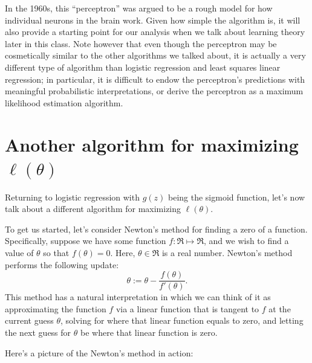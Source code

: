 \documentclass{article}
\begin{document}
In the 1960s, this ``perceptron'' was argued to be a rough model for
how individual neurons in the brain work.  Given how simple the algorithm
is, it will also provide a starting point for our analysis when we talk
about learning theory later in this class.  Note however
that even though the perceptron may be cosmetically similar to the other
algorithms we talked about, it is actually a very different type of algorithm
than logistic regression and least squares linear regression;
in particular, it is difficult to endow the perceptron's predictions
with meaningful probabilistic interpretations, or derive the perceptron
as a maximum likelihood estimation algorithm.

\section{Another algorithm for maximizing $\ell(\theta)$}

Returning to logistic regression with $g(z)$ being the sigmoid function,
let's now talk about a different algorithm for maximizing $\ell(\theta)$.

To get us started, let's consider Newton's method for finding a zero
of a function.  Specifically,
suppose we have some function $f : \Re \mapsto \Re$, and we wish to
find a value of $\theta$ so that $f(\theta) = 0$.
Here, $\theta \in \Re$ is a real number.  Newton's method performs the following
update:
\[
\theta := \theta - \frac{f(\theta)}{f'(\theta)}.
\]
This method has a natural interpretation in which we can think of it as
approximating the function $f$ via a linear function that is tangent to
$f$ at the current guess $\theta$, solving for where that linear function
equals to zero, and letting the next guess for $\theta$ be where that linear
function is zero.

Here's a picture of the Newton's method in action:
\end{document}
